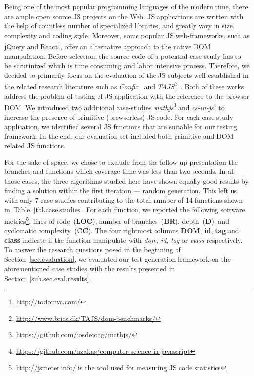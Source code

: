 \documentclass[sigconf,review, anonymous]{acmart}
\begin{document}
Being one of the most popular programming languages of the modern time, there are ample open source JS projects on the Web. JS applications are written with the help of countless number of specialized libraries, and greatly vary in size, complexity and coding style. Moreover, some popular JS web-frameworks, such as jQuery and React\footnote{\url{http://todomvc.com/}}, offer an alternative approach to the native DOM manipulation. Before selection, the source code of a potential case-study has to be scrutinized which is time consuming and labor intensive process. Therefore, we decided to primarily focus on the evaluation of the JS subjects well-established in the related research literature such as \emph{Confix}~\cite{amin:ase15} and \emph{TAJS}\footnote{\url{http://www.brics.dk/TAJS/dom-benchmarks/}}~\cite{dom2011}. Both of these works address the problem of testing of JS application with the reference to the browser DOM. We introduced two additional case-studies \emph{mathjs}\footnote{\url{https://github.com/josdejong/mathjs/}} and \emph{cs-in-js}\footnote{\url{https://github.com/nzakas/computer-science-in-javascript}} to increase the presence of primitive (browserless) JS code. For each case-study application, we identified several JS functions that are suitable for our testing framework. In the end, our evaluation set included both primitive and DOM related JS functions.

For the sake of space, we chose to exclude from the follow up presentation the branches and functions which coverage time was less than two seconds. In all those cases, the three algorithms studied here have shown equally good results by finding a solution within the first iteration --- random generation. This left us with only 7 case studies contributing to the total number of 14 functions  shown in~Table~\ref{tbl.case.studies}. For each function, we reported the following software metrics\footnote{\url{http://jsmeter.info/} is the tool used for measuring JS code statistics}: lines of code~(\textbf{LOC}), number of branches~(\textbf{BR}), depth~(\textbf{D}), and cyclomatic complexity~(\textbf{CC}). The four rightmost columns \textbf{DOM}, \textbf{id}, \textbf{tag} and \textbf{class} indicate if the function manipulate with \emph{dom}, \emph{id}, \emph{tag} or \emph{class} respectively. To answer the research questions posed in the beginning of Section~\ref{sec.evaluation}, we evaluated our test generation framework on the aforementioned case studies with the results presented in Section~\ref{sub.sec.eval.results}.  
       
\end{document}

